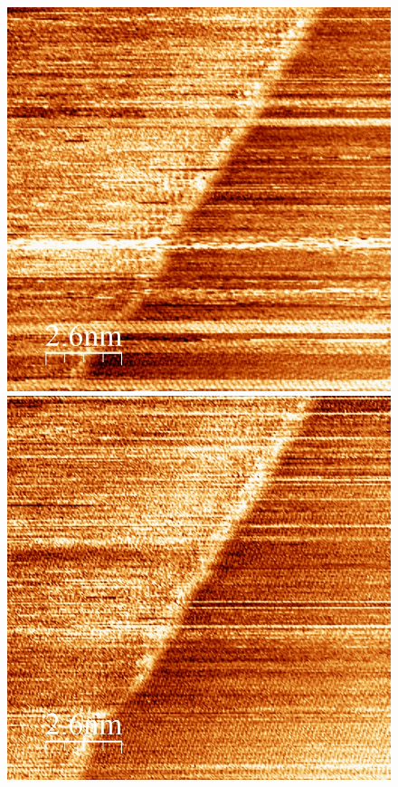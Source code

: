 \documentclass[12pt,a4paper]{article}
\begin{document}
\begin{figure}
\centering
\includegraphics[scale=0.36]{Bilder/Igain4000.jpg}
\includegraphics[scale=0.36]{Bilder/Igain8000.jpg}

\end{figure}
\end{document}
